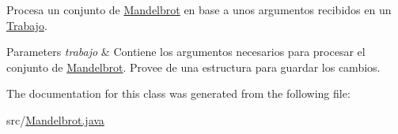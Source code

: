 Procesa un conjunto de \hyperlink{classMandelbrot}{Mandelbrot} en base a unos argumentos recibidos en un \hyperlink{classTrabajo}{Trabajo}. 


\begin{DoxyParams}{Parameters}
{\em trabajo} & Contiene los argumentos necesarios para procesar el conjunto de \hyperlink{classMandelbrot}{Mandelbrot}. Provee de una estructura para guardar los cambios. \\
\hline
\end{DoxyParams}


The documentation for this class was generated from the following file\+:\begin{DoxyCompactItemize}
\item 
src/\hyperlink{Mandelbrot_8java}{Mandelbrot.\+java}\end{DoxyCompactItemize}
